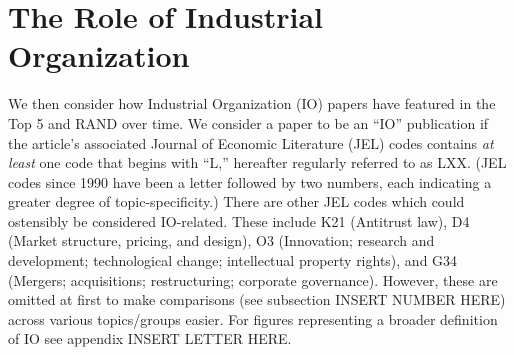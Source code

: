 \documentclass[11pt, letterpaper, twoside]{article}
\begin{document}
\section{The Role of Industrial Organization}
We then consider how Industrial Organization (IO) papers have featured in the Top 5 and RAND over time. We consider a paper to be an ``IO'' publication if the article's associated Journal of Economic Literature (JEL) codes contains \textit{at least} one code that begins with ``L,'' hereafter regularly referred to as LXX. (JEL codes since 1990 have been a letter followed by two numbers, each indicating a greater degree of topic-specificity.) There are other JEL codes which could ostensibly be considered IO-related. These include K21 (Antitrust law), D4 (Market structure, pricing, and design), O3 (Innovation; research and development; technological change; intellectual property rights), and G34 (Mergers; acquisitions; restructuring; corporate governance). However, these are omitted at first to make comparisons (see subsection INSERT NUMBER HERE) across various topics/groups easier. For figures representing a broader definition of IO see appendix INSERT LETTER HERE.\\
\end{document}
